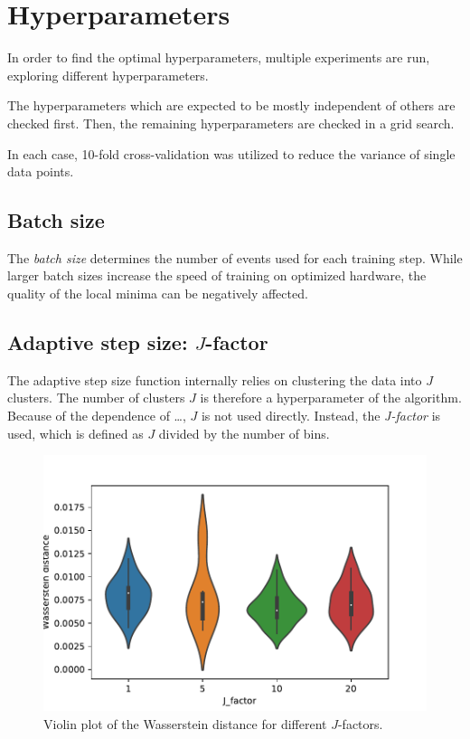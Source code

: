 \section{Hyperparameters}
In order to find the optimal hyperparameters,
multiple experiments are run,
exploring different hyperparameters.

The hyperparameters which are expected to be mostly independent of others are checked first.
Then, the remaining hyperparameters are checked in a grid search. %

In each case, 10-fold cross-validation was utilized to reduce the variance of single data points.


\subsection{Batch size}
The \emph{batch size} determines the number of events used for each training step.
While larger batch sizes increase the speed of training
on optimized hardware,
the quality of the local minima can be negatively affected.



\subsection{Adaptive step size: $J$-factor}
The adaptive step size function internally relies on clustering the data into $J$ clusters.
The number of clusters $J$ is therefore a hyperparameter of the algorithm.
Because of the dependence of …,
$J$ is not used directly.
Instead, the \emph{J-factor} is used,
which is defined as $J$ divided by the number of bins.

\begin{figure}
  \centering
  \includegraphics[scale=1]{content/plots/halftime/wd_per_J_factor.pdf}
  \caption{Violin plot of the Wasserstein distance for different $J$-factors.}
  \label{fig:hyperparameter:J_factor}
\end{figure}


